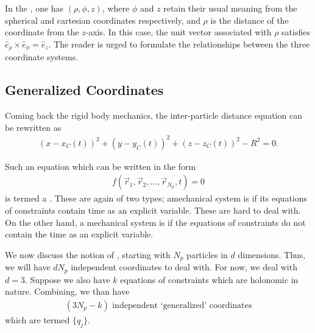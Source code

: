 In the , one has $(\rho,\phi,z)$, where $\phi$ and $z$ retain their usual meaning from the spherical and cartesian coordinates respectively, and $\rho$ is the distance of the coordinate from the $z$-axis. In this case, the unit vector associated with $\rho$ satisfies $\hat{e}_{\rho} \times \hat{e}_{\phi} = \hat{e}_{z}$. The reader is urged to formulate the relationships between the three coordinate systems.

\subsection{Generalized Coordinates}

Coming back the rigid body mechanics, the inter-particle distance equation can be rewritten as
\begin{align}
    (x-x_{C}(t))^{2} + (y-y_{C}(t))^{2} + (z-z_{C}(t))^{2} - R^{2} = 0.
\end{align}

Such an equation which can be written in the form
\begin{align}
    f(\vec{r}_{1},\vec{r}_{2},\ldots,\vec{r}_{N_{p}},t) = 0
\end{align}
is termed a . These are again of two types; amechanical system is  if its equations of constraints contain time as an explicit variable. These are hard to deal with. On the other hand, a mechanical system is  if the equations of constraints do not contain the time as an explicit variable.

We now discuss the notion of , starting with $N_{p}$ particles in $d$ dimensions. Thus, we will have $dN_{p}$ independent coordinates to deal with. For now, we deal with $d = 3$. Suppose we also have $k$ equations of constraints which are holonomic in nature. Combining, we than have
\begin{align}
    (3N_{p}-k) \text{ independent `generalized' coordinates}
\end{align}
which are termed $\{q_{j}\}$.

